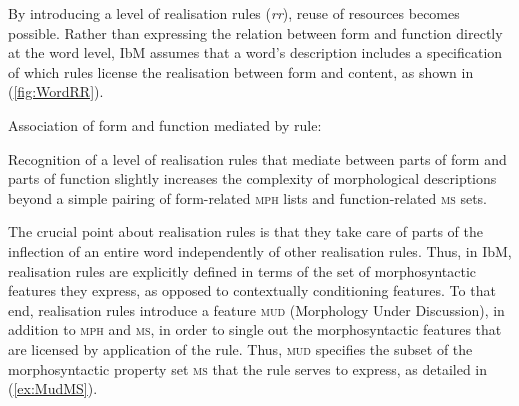 \documentclass[output=paper
 	        ,biblatex
                ,babelshorthands
                ,newtxmath
                ,draftmode
                ,colorlinks, citecolor=brown
]{langscibook}
\begin{document}
\begin{exe}
\begin{xlist}
By  introducing a level of realisation rules (\textit{rr}), reuse
of resources becomes possible. Rather than expressing the relation
between form and function directly at the word level, IbM assumes that
a word's description includes a specification of which rules license
the realisation between form and content, as shown in 
(\ref{fig:WordRR}).


\eas
\label{fig:WordRR}
Association of form and function mediated by rule:\\
%
%
%
\zs

Recognition of a level of realisation rules that mediate between parts
of form and parts of function slightly increases the complexity of
morphological descriptions beyond a simple pairing of form-related
\textsc{mph} lists and function-related \textsc{ms} sets. 

The crucial point about realisation rules is that they take care of
parts of the inflection of an entire word independently of other
realisation rules. Thus, in IbM, realisation rules are explicitly
defined in terms of the set of morphosyntactic features they express,
as opposed to contextually conditioning features. To that end, realisation
rules introduce a feature \textsc{mud} (Morphology Under Discussion),
in addition to \textsc{mph} and \textsc{ms}, in order to single out
the morphosyntactic features that are licensed by application of the
rule. Thus, \textsc{mud} specifies the subset of the morphosyntactic
property set \textsc{ms} that the rule serves to express, as detailed
in (\ref{ex:MudMS}). 


\end{xlist}
\end{exe}
\end{document}
